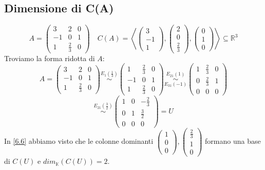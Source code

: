 \documentclass[a4paper]{article}
\theoremstyle{break}
\theoremstyle{break}
\theoremstyle{break}
\theoremstyle{break}
\begin{document}
\subsection{Dimensione di C(A)}
\label{8.3}
\begin{example}
  \[
  A = \begin{pmatrix} 
    3 & 2 & 0\\
    -1 & 0 & 1\\
    1 & \frac{2}{3} & 0
  \end{pmatrix} 
  \quad
  C(A) = \left<
  \begin{pmatrix} 
    3\\-1\\1
  \end{pmatrix},
  \begin{pmatrix} 
    2\\0\\\frac{2}{3}
  \end{pmatrix},
  \begin{pmatrix} 
    0\\1\\0
  \end{pmatrix}
  \right> \subseteq \mathbb{R}^3
  \] 
  Troviamo la forma ridotta di \( A \):
  \[
  A = \begin{pmatrix} 
    3 & 2 & 0\\
    -1 & 0 & 1\\
    1 & \frac{2}{3} & 0
  \end{pmatrix} 
  \stackrel{E_1(\frac{1}{3})}{\sim}
  \begin{pmatrix} 
    1 & \frac{2}{3} & 0\\
    -1 & 0 & 1\\
    1 & \frac{2}{3} & 0
  \end{pmatrix} 
  \stackrel{E_{21}(1)}{\underset{E_{31}(-1)}{\sim}}
  \begin{pmatrix} 
    1 & \frac{2}{3} & 0\\
    0 & \frac{2}{3} & 1\\
    0 & 0 & 0
  \end{pmatrix} 
  \] 
  \[
  \stackrel{E_{21}(\frac{3}{2})}{\sim}
  \begin{pmatrix} 
    1 & 0 & -\frac{2}{3}\\
    0 & 1 & \frac{3}{2}\\
    0 & 0 & 0
  \end{pmatrix}
  = U
  \] 
  In \ref{6.6} abbiamo visto che le colonne dominanti \( \begin{pmatrix} 
    1\\0\\0
  \end{pmatrix},
  \begin{pmatrix} 
    \frac{2}{3}\\1\\0
  \end{pmatrix} \) formano una base di \( C(U) \) e \( dim_{\mathbb{K}}(C(U)) = 2 \).


\end{example}
\end{document}
